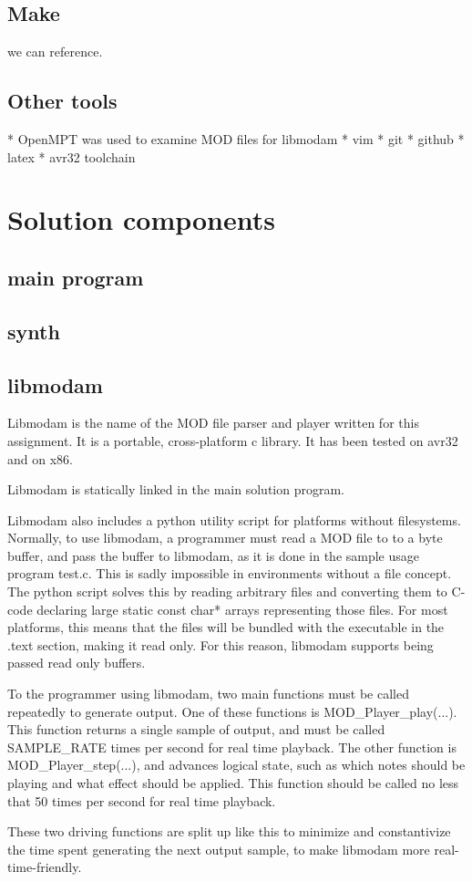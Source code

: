 \subsection{Make}
we can reference.

\subsection{Other tools}
* OpenMPT was used to examine MOD files for libmodam
* vim
* git
* github
* latex
* avr32 toolchain


\section{Solution components}

\subsection{main program}
\subsection{synth}

\subsection{libmodam}

Libmodam is the name of the MOD file parser and player written for this assignment.
It is a portable, cross-platform c library.
It has been tested on avr32 and on x86.

Libmodam is statically linked in the main solution program.

Libmodam also includes a python utility script for platforms without filesystems.
Normally, to use libmodam, a programmer must read a MOD file to to a byte buffer, and pass the buffer to libmodam, as it is done in the sample usage program test.c.
This is sadly impossible in environments without a file concept.
The python script solves this by reading arbitrary files and converting them to C-code declaring large static const char* arrays representing those files.
For most platforms, this means that the files will be bundled with the executable in the .text section, making it read only.
For this reason, libmodam supports being passed read only buffers.


To the programmer using libmodam, two main functions must be called repeatedly to generate output.
One of these functions is MOD_Player_play(...).
This function returns a single sample of output, and must be called SAMPLE_RATE times per second for real time playback.
The other function is MOD_Player_step(...), and advances logical state, such as which notes should be playing and what effect should be applied.
This function should be called no less that 50 times per second for real time playback.

These two driving functions are split up like this to minimize and constantivize the time spent generating the next output sample, to make libmodam more real-time-friendly.
